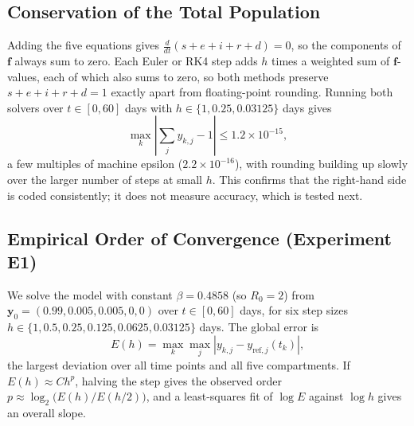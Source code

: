 \documentclass[11pt,a4paper]{article}
\begin{document}
\subsection{Conservation of the Total Population}
Adding the five equations gives $\frac{d}{dt}(s+e+i+r+d) = 0$, so the components of $\mathbf{f}$ always sum to zero. Each Euler or RK4 step adds $h$ times a weighted sum of $\mathbf{f}$-values, each of which also sums to zero, so both methods preserve $s+e+i+r+d = 1$ exactly apart from floating-point rounding. Running both solvers over $t \in [0, 60]$ days with $h \in \{1, 0.25, 0.03125\}$ days gives
\begin{equation}
    \max_{k} \left| \sum_{j} y_{k,j} - 1 \right| \le 1.2 \times 10^{-15},
\end{equation}
a few multiples of machine epsilon ($2.2 \times 10^{-16}$), with rounding building up slowly over the larger number of steps at small $h$. This confirms that the right-hand side is coded consistently; it does not measure accuracy, which is tested next.

\subsection{Empirical Order of Convergence (Experiment E1)}
We solve the model with constant $\beta = 0.4858$ (so $R_0 = 2$) from $\mathbf{y}_0 = (0.99, 0.005, 0.005, 0, 0)$ over $t \in [0, 60]$ days, for six step sizes $h \in \{1, 0.5, 0.25, 0.125, 0.0625, 0.03125\}$ days. The global error is
\begin{equation}
    E(h) = \max_{k} \max_{j} \left| y_{k,j} - y_{\text{ref},j}(t_k) \right|,
\end{equation}
the largest deviation over all time points and all five compartments. If $E(h) \approx C h^p$, halving the step gives the observed order $p \approx \log_2\!\big(E(h)/E(h/2)\big)$, and a least-squares fit of $\log E$ against $\log h$ gives an overall slope.
\end{document}
